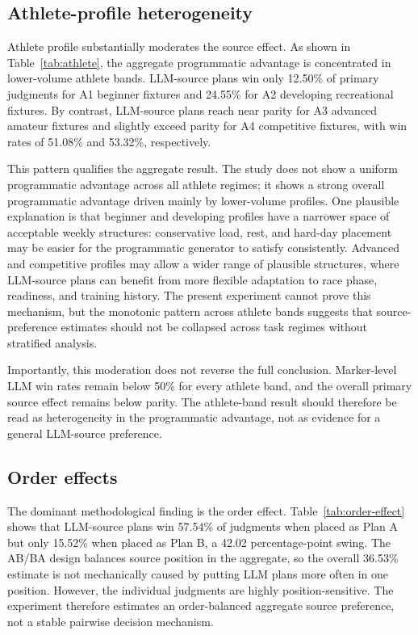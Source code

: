 \documentclass[11pt]{article}
\begin{document}
\subsection{Athlete-profile heterogeneity}

Athlete profile substantially moderates the source effect. As shown in Table~\ref{tab:athlete}, the aggregate programmatic advantage is concentrated in lower-volume athlete bands. LLM-source plans win only 12.50\% of primary judgments for A1 beginner fixtures and 24.55\% for A2 developing recreational fixtures. By contrast, LLM-source plans reach near parity for A3 advanced amateur fixtures and slightly exceed parity for A4 competitive fixtures, with win rates of 51.08\% and 53.32\%, respectively.

This pattern qualifies the aggregate result. The study does not show a uniform programmatic advantage across all athlete regimes; it shows a strong overall programmatic advantage driven mainly by lower-volume profiles. One plausible explanation is that beginner and developing profiles have a narrower space of acceptable weekly structures: conservative load, rest, and hard-day placement may be easier for the programmatic generator to satisfy consistently. Advanced and competitive profiles may allow a wider range of plausible structures, where LLM-source plans can benefit from more flexible adaptation to race phase, readiness, and training history. The present experiment cannot prove this mechanism, but the monotonic pattern across athlete bands suggests that source-preference estimates should not be collapsed across task regimes without stratified analysis.

Importantly, this moderation does not reverse the full conclusion. Marker-level LLM win rates remain below 50\% for every athlete band, and the overall primary source effect remains below parity. The athlete-band result should therefore be read as heterogeneity in the programmatic advantage, not as evidence for a general LLM-source preference.

\subsection{Order effects}

The dominant methodological finding is the order effect. Table~\ref{tab:order-effect} shows that LLM-source plans win 57.54\% of judgments when placed as Plan A but only 15.52\% when placed as Plan B, a 42.02 percentage-point swing. The AB/BA design balances source position in the aggregate, so the overall 36.53\% estimate is not mechanically caused by putting LLM plans more often in one position. However, the individual judgments are highly position-sensitive. The experiment therefore estimates an order-balanced aggregate source preference, not a stable pairwise decision mechanism.
\end{document}
